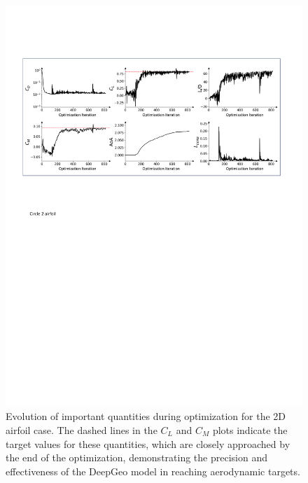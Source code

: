 \begin{figure}[htb]
     \begin{center}
         \includegraphics[width=1\linewidth]{chapter5/fig/circle2airfoil_optim_history.pdf}
     \end{center}
      \vspace{-7mm}
     \caption{
         \small Evolution of important quantities during optimization for the 2D airfoil case. The dashed lines in the $C_L$ and $C_M$ plots indicate the target values for these quantities, which are closely approached by the end of the optimization, demonstrating the precision and effectiveness of the DeepGeo model in reaching aerodynamic targets.
     }
     \label{ch5:fig:cs1_history}
 \end{figure}

